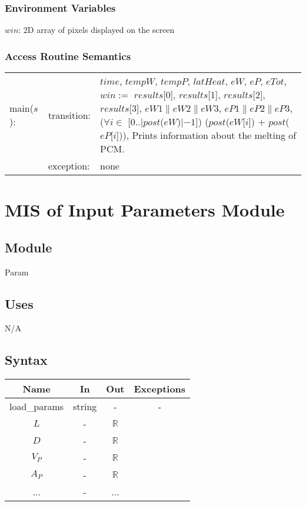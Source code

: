 \documentclass[12pt]{article}
\begin{document}
\subsubsection{Environment Variables}

$win$: 2D array of pixels displayed on the screen

\subsubsection{Access Routine Semantics}

\begin{tabular}{l l p{12cm}}
main($s$): & transition: & $time$, $tempW$, $tempP$, $latHeat$, $eW$, $eP$,
                           $eTot$, $win :=$ $results$[0], $results$[1],
                           $results$[2], $results$[3], $eW1 \| eW2 \| eW3$, $eP1
                           \| eP2 \| eP3$, ($\forall i \in$ [0..$|post$($eW$)$|
                           - 1$]) ($post$($eW$[$i$]) $+$ $post$($eP$[$i$])),
                           Prints information about the melting of PCM. \\
& exception: & none \\
\end{tabular}

\newpage
\section{MIS of Input Parameters Module} \label{Parameters}

\subsection{Module}

Param

\subsection{Uses}

N/A

\subsection{Syntax}

\begin{tabular}{c c c c}
\toprule
\textbf{Name} & \textbf{In} & \textbf{Out} & \textbf{Exceptions} \\
\midrule
load\_params & string & - &  - \\
$L$ & - & $\mathbb{R}$\\
$D$ & - & $\mathbb{R}$\\
$V_P$ & - & $\mathbb{R}$\\
$A_P$ & - & $\mathbb{R}$\\
... & - & ...\\
\bottomrule
\end{tabular}
\end{document}
